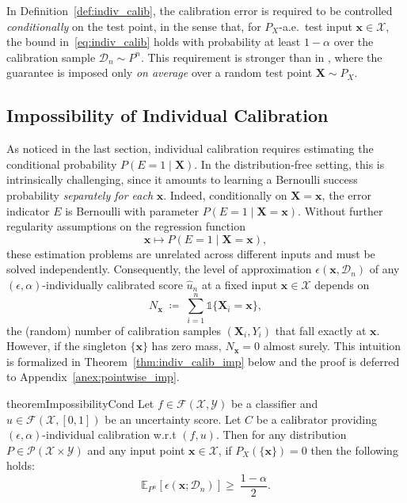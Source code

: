 \documentclass{article}
\theoremstyle{plain}
\theoremstyle{definition}
\theoremstyle{remark}
\begin{document}
In Definition~\ref{def:indiv_calib}, the calibration error is required to be controlled \emph{conditionally} on the test point, in the sense that, for $P_X$-a.e.\ test input $\mathbf{x}\in\mathcal X$, the bound in~\eqref{eq:indiv_calib} holds with probability at least $1-\alpha$ over the calibration sample $\mathcal D_n\sim P^n$. This requirement is stronger than in \cite{zhao_individual_2020, barber2020limitsdistributionfreeconditionalpredictive}, where the guarantee is imposed only \emph{on average} over a random test point $\mathbf{X}\sim P_X$. 

\subsection{Impossibility of Individual Calibration}
\label{sec:impossibility_indiv_calib}

As noticed in the last section, individual calibration requires estimating the conditional probability $P(E=1 \mid \mathbf{X})$. In the distribution-free setting, this is 
intrinsically challenging, since it amounts to learning a Bernoulli success probability \emph{separately for each} $\mathbf{x}$.
Indeed, conditionally on $\mathbf{X}=\mathbf{x}$, the error indicator $E$ is Bernoulli with parameter $P(E=1 \mid \mathbf{X}=\mathbf{x})$.
Without further regularity assumptions on the regression function
$$
\mathbf{x} \mapsto P(E=1\mid \mathbf{X} =\mathbf{x}),
$$
these estimation problems are unrelated across different inputs and must be solved independently.
Consequently, the level of approximation $\epsilon(\mathbf{x}, \mathcal{D}_n)$ of any $(\epsilon, \alpha)$-individually calibrated score $\widehat{u}_n$ at a fixed input $\mathbf{x}\in\mathcal X$ depends on
\[
N_{\mathbf{x}} \;\coloneqq\; \sum_{i=1}^n \mathds{1}\{\mathbf{X}_i=\mathbf{x}\},
\]
the (random) number of calibration samples $(\mathbf{X}_i,Y_i)$ that fall exactly at $\mathbf{x}$. However, if the singleton $\{\mathbf{x}\}$ has zero mass, $N_\mathbf{x} = 0$ almost surely. This intuition is formalized in Theorem~\ref{thm:indiv_calib_imp} below and the proof is deferred to Appendix~\ref{anex:pointwise_imp}.

\begin{restatable}[]{theorem}{ImpossibilityCond}
\label{thm:indiv_calib_imp}
Let $f\in\mathcal F(\mathcal X,\mathcal Y)$ be a classifier and $u \in \mathcal{F}(\mathcal{X}, [0,1])$ be an uncertainty score. Let $C$ be a calibrator providing $(\epsilon, \alpha)$-individual calibration w.r.t $(f,u)$. Then for any distribution $P\in \mathcal{P}(\mathcal{X} \times \mathcal{Y})$ and any input point $\mathbf{x} \in \mathcal{X}$, if $P_X(\{\mathbf{x}\})=0$ then the following holds:
\begin{equation}
\label{eq:expected_length_lb}
\mathbb{E}_{P^n}[\epsilon(\mathbf{x}; \mathcal{D}_n)] \ge\ \frac{1-\alpha}{2}.
\end{equation}

\end{restatable}
\end{document}
